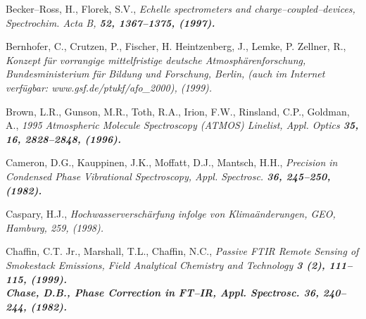 \begin{thebibliography}{giese-bogdan,199797}
\label{literatur}


 Becker--Ross, H.,
Florek, S.V., \it Echelle spectrometers and
charge--coupled--devices\rm , Spectrochim. Acta B, \bf 52\rm ,
1367--1375, (1997).

 Bernhofer, C., Crutzen, P., Fischer,
H. Heintzenberg, J., Lemke, P. Zellner, R., \it Konzept f\"{u}r
vorrangige mittelfristige deutsche Atmosph\"{a}renforschung\rm ,
Bundesministerium f\"{u}r Bildung und Forschung, Berlin, (auch im
Internet verf\"{u}gbar: www.gsf.de/ptukf/afo\_2000), (1999).


 Brown, L.R., Gunson, M.R., Toth,
R.A., Irion, F.W., Rinsland, C.P., Goldman, A., \it 1995
Atmospheric Molecule Spectroscopy (ATMOS) Linelist\rm , Appl.
Optics \bf 35\rm , 16, 2828--2848, (1996).

 Cameron, D.G., Kauppinen, J.K.,
Moffatt, D.J., Mantsch, H.H., \it Precision in Condensed Phase
Vibrational Spectroscopy\rm , Appl. Spectrosc. \bf 36\rm ,
245--250, (1982).

Caspary, H.J., \it
Hochwasserversch\"{a}rfung infolge von Klima\"{a}nderungen\rm, GEO,
Hamburg, 259, (1998).

 Chaffin, C.T. Jr., Marshall,
T.L., Chaffin, N.C., \it Passive FTIR Remote Sensing of Smokestack
Emissions\rm , Field Analytical Chemistry and Technology \bf 3\rm
(2), 111--115, (1999).\\

Chase, D.B., \it Phase Correction in
FT--IR\rm, Appl. Spectrosc. \bf 36\rm, 240--244, (1982).


\end{thebibliography}
